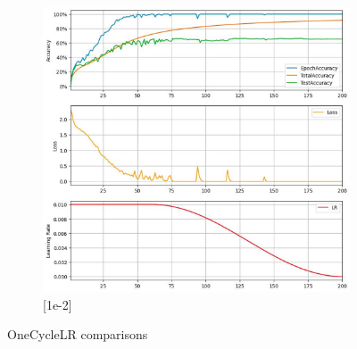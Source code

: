 \documentclass[11pt, a4paper, oneside]{assets/tex/thesis} %
\begin{document}
{\begin{itemize}
\begin{figure}[h]
\begin{subfigure}[b]{0.5\textwidth}
            \includegraphics[width=\textwidth]{assets/img/onecycle_decreasing_lr.png}
            \caption{[1e-2]}
            \label{fig:onecycle_decreasing_lr}
        \end{subfigure}%
        \caption{OneCycleLR comparisons}
    \end{figure}


\end{itemize}}
\end{document}
